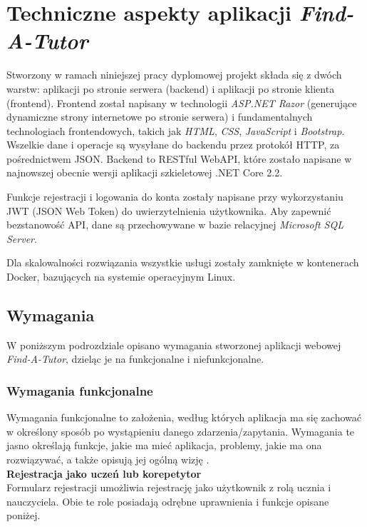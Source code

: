 \documentclass[12pt]{article}
\numberwithin{figure}{section}
\begin{document}
\begin{sloppypar}
\clearpage
\section{Techniczne aspekty aplikacji \textit{Find-A-Tutor}} \label{tech-aspect}
Stworzony w ramach niniejszej pracy dyplomowej projekt składa się z dwóch warstw: 
aplikacji po stronie serwera (backend) i aplikacji po stronie klienta (frontend).
Frontend został napisany w technologii \textit{ASP.NET Razor} (generujące dynamiczne strony internetowe po stronie serwera) i fundamentalnych technologiach frontendowych, takich jak \textit{HTML}, \textit{CSS}, \textit{JavaScript} i \textit{Bootstrap}. Wszelkie dane i operacje są wysyłane do backendu przez protokół HTTP, za pośrednictwem JSON. 
Backend to RESTful WebAPI, które zostało napisane w najnowszej obecnie wersji aplikacji szkieletowej .NET Core 2.2.

Funkcje rejestracji i logowania do konta zostały napisane przy wykorzystaniu JWT (JSON Web Token) do uwierzytelnienia użytkownika. Aby zapewnić bezstanowość API, dane są przechowywane w bazie relacyjnej \textit{Microsoft SQL Server}.

Dla skalowalności rozwiązania wszystkie usługi zostały zamknięte w kontenerach Docker, bazujących na systemie operacyjnym Linux.

\subsection{Wymagania}
W poniższym podrozdziale opisano wymagania stworzonej aplikacji webowej \textit{Find-A-Tutor}, dzieląc je na funkcjonalne i niefunkcjonalne. 

\subsubsection{Wymagania funkcjonalne}
Wymagania funkcjonalne to założenia, według których aplikacja ma się zachować w określony sposób po wystąpieniu danego zdarzenia/zapytania. Wymagania te jasno określają funkcje, jakie ma mieć aplikacja, problemy, jakie ma ona rozwiązywać, a także opisują jej ogólną wizję \cite{funkcjonalne}. \\
\noindent
\textbf{Rejestracja jako uczeń lub korepetytor}\\
\indent
Formularz rejestracji umożliwia rejestrację jako użytkownik z rolą ucznia i nauczyciela. Obie te role posiadają odrębne uprawnienia i funkcje opisane poniżej.


\end{sloppypar}
\end{document}
